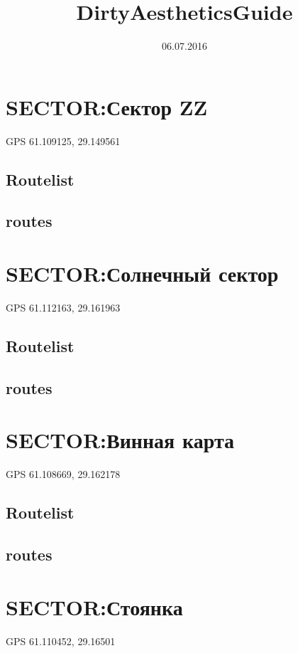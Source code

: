 \documentclass[8pt, a5paper,notitlepage,openany]{report}
\begin{document}
\title{DirtyAestheticsGuide}
\date{06.07.2016}
\tableofcontents
\pagestyle{fancy}




\chapter{SECTOR:Сектор ZZ}
GPS 61.109125, 29.149561
\section*{Routelist}

\newpage
\section*{routes}


 \clearpage 
\chapter{SECTOR:Солнечный сектор}
 GPS 61.112163, 29.161963
\section*{Routelist}

\newpage
\section*{routes}



\clearpage 
\chapter{SECTOR:Винная карта}
 GPS 61.108669, 29.162178
\section*{Routelist}
 
 \newpage
 \section*{routes}
 
 

 \clearpage 
\chapter{SECTOR:Стоянка}
 GPS 61.110452, 29.16501
\end{document}
